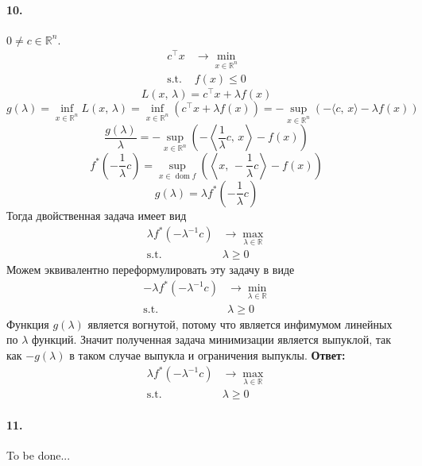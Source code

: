 \documentclass{article}
\DeclareMathOperator{\dom}{dom}
\newcommand*{\R}{\mathbb{R}}
\newcommand*{\st}{\text{s.t. }}
\newcommand*{\1}{\mathbf{1}}
\begin{document}
\paragraph{10.} $0 \neq c \in \R^n$.
\[ \begin{split}
    c^\top x &\to \min\limits_{x \in \R^n} \\
    \st & f(x) \leqslant 0
\end{split} \]
\[ L(x,\, \lambda) = c^\top x + \lambda f(x) \]
\[ g(\lambda) = \inf\limits_{x \in \R^n} L(x,\, \lambda) = \inf\limits_{x \in \R^n} \left( c^\top x + \lambda f(x) \right) = -\sup\limits_{x \in \R^n} \left( -\langle c,\, x\rangle - \lambda f(x) \right) \]
\[ \frac{g(\lambda)}{\lambda} = - \sup\limits_{x \in \R^n}\left( -\left\langle \frac{1}{\lambda} c,\, x \right \rangle - f(x) \right) \]
\[ f^\ast\left(-\frac{1}{\lambda}c\right) = \sup\limits_{x \in \dom f} \left( \left\langle x,\, -\frac{1}{\lambda}c \right\rangle - f(x) \right) \]
\[ g(\lambda) = \lambda f^\ast\left(-\frac{1}{\lambda}c\right) \]
Тогда двойственная задача имеет вид
\[ \begin{split}
    \lambda f^\ast\left(-\lambda^{-1}c\right) &\to \max\limits_{\lambda \in \R} \\
    \st &\lambda \geqslant 0
\end{split} \]
Можем эквивалентно переформулировать эту задачу в виде
\[ \begin{split}
    -\lambda f^\ast\left(-\lambda^{-1}c\right) &\to \min\limits_{\lambda \in \R} \\
    \st &\lambda \geqslant 0
\end{split} \]
Функция $g(\lambda)$ является вогнутой, потому что является инфимумом линейных по $\lambda$ функций. Значит полученная задача минимизации является выпуклой, так как $-g(\lambda)$ в таком случае выпукла и ограничения выпуклы. 
\textbf{Ответ: }
\[ \begin{split}
    \lambda f^\ast\left(-\lambda^{-1}c\right) &\to \max\limits_{\lambda \in \R} \\
    \st &\lambda \geqslant 0
\end{split} \]


\paragraph{11.} To be done...
\end{document}
